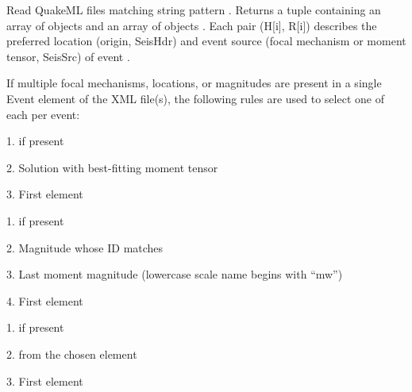 \documentclass[letterpaper,11pt,english]{sphinxmanual}
\begin{document}
Read QuakeML files matching string pattern . Returns a tuple containing
an array of  objects  and an array of  objects .
Each pair (H{[}i{]}, R{[}i{]}) describes the preferred location (origin, SeisHdr) and
event source (focal mechanism or moment tensor, SeisSrc) of event .

If multiple focal mechanisms, locations, or magnitudes are present in a single
Event element of the XML file(s), the following rules are used to select one of
each per event:

\begin{DUlineblock}{0em}
\item[] 
\item[]
\begin{DUlineblock}{\DUlineblockindent}
\item[] 1.  if present
\item[] 2. Solution with best-fitting moment tensor
\item[] 3. First  element
\item[] 
\end{DUlineblock}
\item[] 
\item[]
\begin{DUlineblock}{\DUlineblockindent}
\item[] 1.  if present
\item[] 2. Magnitude whose ID matches 
\item[] 3. Last moment magnitude (lowercase scale name begins with “mw”)
\item[] 4. First  element
\item[] 
\end{DUlineblock}
\item[] 
\item[]
\begin{DUlineblock}{\DUlineblockindent}
\item[] 1.  if present
\item[] 2.  from the chosen  element
\item[] 3. First  element
\end{DUlineblock}
\end{DUlineblock}
\end{document}
